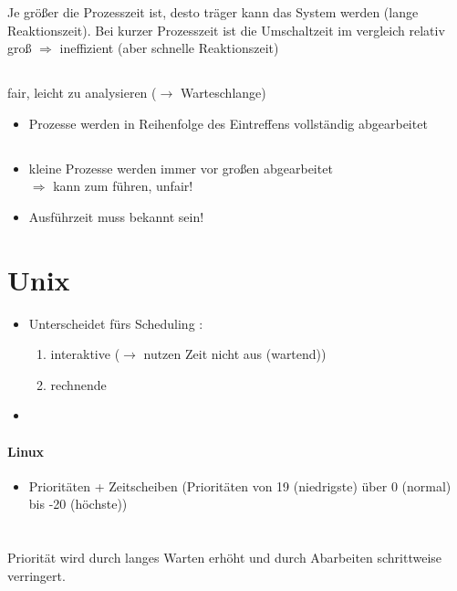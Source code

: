 Je größer die Prozesszeit ist, desto träger kann das System werden (lange Reaktionszeit). Bei kurzer Prozesszeit ist die Umschaltzeit im vergleich relativ groß $\Rightarrow$ ineffizient (aber schnelle Reaktionszeit)

\subsection[FIFO/FCFS]{}
fair, leicht zu analysieren ($\to$ Warteschlange)
\begin{itemize}
\item Prozesse werden in Reihenfolge des Eintreffens vollständig abgearbeitet
\end{itemize}
\subsection[Shortest Job Next (SJN)]{}
\begin{itemize}
\item kleine Prozesse werden immer vor großen abgearbeitet\\
$\Rightarrow$ kann zum  führen, unfair!
\item Ausführzeit muss bekannt sein!
\end{itemize}

\section{Unix}
\begin{itemize}
\item Unterscheidet fürs Scheduling :
\begin{enumerate}
\item interaktive ($\to$ nutzen Zeit nicht aus (wartend))
\item rechnende
\end{enumerate}
\item {}
\end{itemize}

\paragraph{Linux}
\begin{itemize}
\item Prioritäten + Zeitscheiben (Prioritäten von 19 (niedrigste) über 0 (normal) bis -20 (höchste))
\end{itemize}

\section[Priority Boost]{}
Priorität wird durch langes Warten erhöht und durch Abarbeiten schrittweise verringert.

